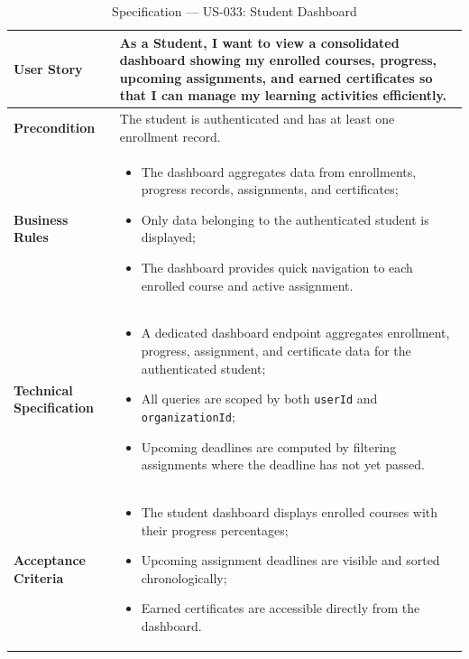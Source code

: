 \begin{table}[H]
\centering
\caption{Specification — US-033: Student Dashboard}
\label{tab:us033}
\renewcommand{\arraystretch}{1.2}
\begin{tabularx}{\textwidth}{|p{3.5cm}|X|}
\hline
\textbf{User Story} & As a Student, I want to view a consolidated dashboard showing my enrolled courses, progress, upcoming assignments, and earned certificates so that I can manage my learning activities efficiently. \\
\hline
\textbf{Precondition} & The student is authenticated and has at least one enrollment record. \\
\hline
\textbf{Business Rules} &
\begin{itemize}[noitemsep, topsep=2pt]
  \item The dashboard aggregates data from enrollments, progress records, assignments, and certificates;
  \item Only data belonging to the authenticated student is displayed;
  \item The dashboard provides quick navigation to each enrolled course and active assignment.
\end{itemize} \\
\hline
\textbf{Technical Specification} &
\begin{itemize}[noitemsep, topsep=2pt]
  \item A dedicated dashboard endpoint aggregates enrollment, progress, assignment, and certificate data for the authenticated student;
  \item All queries are scoped by both \texttt{userId} and \texttt{organizationId};
  \item Upcoming deadlines are computed by filtering assignments where the deadline has not yet passed.
\end{itemize} \\
\hline
\textbf{Acceptance Criteria} &
\begin{itemize}[noitemsep, topsep=2pt]
  \item The student dashboard displays enrolled courses with their progress percentages;
  \item Upcoming assignment deadlines are visible and sorted chronologically;
  \item Earned certificates are accessible directly from the dashboard.
\end{itemize} \\
\hline
\end{tabularx}
\end{table}

